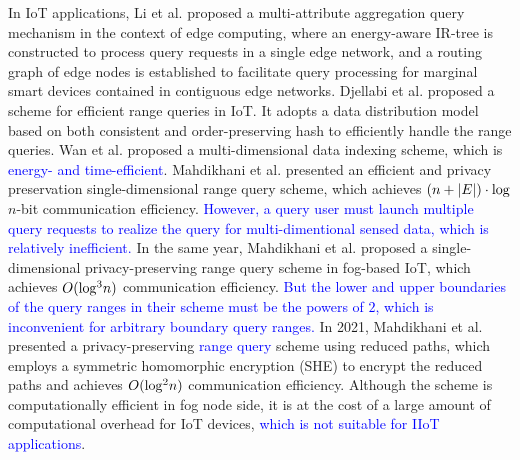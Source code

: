 \documentclass[IEEE JOURNAL OF BIOMEDICAL AND HEALTH INFORMATICS]{IEEEtran}
\begin{document}
  In IoT applications, Li et al. \cite{Li2019} proposed a multi-attribute aggregation query mechanism in the context of edge computing, where an energy-aware IR-tree is constructed to process query requests in a single edge network, and a routing graph of edge nodes is established to facilitate query processing for marginal smart devices contained in contiguous edge networks. Djellabi et al. \cite{2019Effective} proposed a scheme for efficient range queries in IoT. It adopts a data distribution model based on both consistent and order-preserving hash to efficiently handle the range queries. Wan et al. \cite{1111} proposed a multi-dimensional data indexing scheme, which is \textcolor{blue}{energy- and time-efficient}. Mahdikhani et al. \cite{mahdikhani2020IoT} presented an efficient and privacy preservation single-dimensional range query scheme, which achieves $(n+|E|)\cdot \rm {log}$$n$-bit communication efficiency. \textcolor{blue}{However, a query user must launch multiple query requests to realize the query for multi-dimentional sensed data, which is relatively inefficient.} In the same year, Mahdikhani et al. \cite{hasan2020IoT} proposed a single-dimensional privacy-preserving range query scheme in fog-based IoT, which achieves $O({\rm log^{3}}n)$ communication efficiency. \textcolor{blue}{But the lower and upper \textcolor{blue}{boundaries} of the query ranges in their scheme must be the powers of $2$, which is inconvenient for arbitrary boundary query ranges.} In 2021, Mahdikhani et al. \cite{mahdikhani2020using} presented a privacy-preserving \textcolor{blue}{range query} scheme using reduced paths, which employs a symmetric homomorphic encryption (SHE) to encrypt the reduced paths and achieves $O({\rm log^{2}}n)$ communication efficiency. Although the scheme is computationally efficient in fog node side, it is at the cost of a large amount of computational overhead for IoT devices, \textcolor{blue}{which is not suitable for IIoT applications}.

\iffalse
Although many range query solutions have been proposed for different scenarios, most of the schemes just support the single-dimensional range query, i.e., the query user can query only single kind of sensed data by one query request. Therefore, the query user has to launch $m$ query requests to achieve $m$-dimensional range query, which causes significant inconvenience. In industrial field, different kinds of data is usually needed to make intelligent decision. For example, in industrial environment, a manager needs different kinds of data collected from a variety of sensors, such as temperature, operation speed and power consumption, to determine if the devices are running normally. Therefore, multi-dimensional range query . Therefore, we focus on solving the challenge of multi-dimensional range query with privacy preservation in edge-supported IIoT.
\fi
\end{document}
